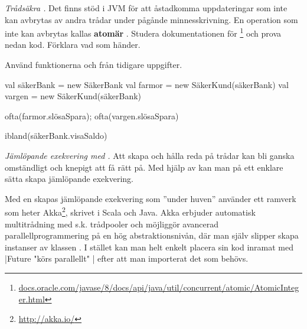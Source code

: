 \Task \emph{Trådsäkra .} Det finns stöd i JVM för att åstadkomma uppdateringar som inte kan avbrytas av andra trådar under pågånde minnesskrivning. En operation som inte kan avbrytas kallas \textbf{atomär} . Studera dokumentationen för \footnote{\href{https://docs.oracle.com/javase/8/docs/api/java/util/concurrent/atomic/AtomicInteger.html}{docs.oracle.com/javase/8/docs/api/java/util/concurrent/atomic/AtomicInteger.html}} och prova nedan kod. Förklara vad som händer.

Använd funktionerna  och  från tidigare uppgifter.
\begin{REPL}
val säkerBank = new SäkerBank
val farmor = new SäkerKund(säkerBank) 
val vargen = new SäkerKund(säkerBank) 

ofta(farmor.slösaSpara); ofta(vargen.slösaSpara)

ibland(säkerBank.visaSaldo)
\end{REPL}





\Task \label{task:future} \emph{Jämlöpande exekvering med .} Att skapa och hålla reda på trådar kan bli ganska omständligt och knepigt att få rätt på. 
Med hjälp av  kan man på ett enklare sätta skapa jämlöpande exekvering. 

\begin{Background}
Med en  skapas jämlöpande exekvering som ''under huven'' använder ett ramverk som heter Akka\footnote{\url{http://akka.io/}}, skrivet i Scala och Java. Akka erbjuder automatisk  multitrådning med s.k. trådpooler och möjliggör avancerad parallellprogrammering på en hög  abstraktionsnivån, där man själv slipper skapa instanser av klassen . I stället kan man helt enkelt placera sin kod inramat med \code|Future{ "körs parallellt" }| efter att man importerat det som behövs.
\end{Background}

